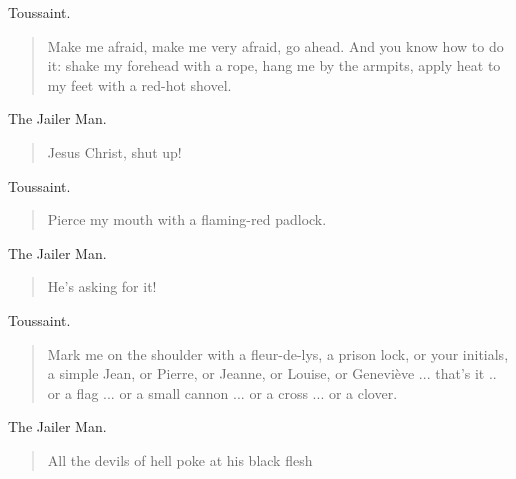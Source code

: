 \documentclass[letterpaper,article,12pt,oneside,notitlepage]{memoir}
\begin{document}
\clearpage

\begin{center}Toussaint.\end{center}

\begin{verse}
Make me afraid, make me very afraid, go ahead. And you know how to do it: shake my forehead with a rope, hang me by the armpits, apply heat to my feet with a red-hot shovel. \\
\end{verse}

\begin{center}The Jailer Man.\end{center}

\begin{verse}
Jesus Christ, shut up! \\
\end{verse}

\begin{center}Toussaint.\end{center}

\begin{verse}
Pierce my mouth with a flaming-red padlock. \\
\end{verse}

\begin{center}The Jailer Man.\end{center}

\begin{verse}
He's asking for it! \\
\end{verse}

\begin{center}Toussaint.\end{center}

\begin{verse}
Mark me on the shoulder with a fleur-de-lys, a prison lock, or your initials, a simple Jean, or Pierre, or Jeanne, or Louise, or Geneviève ... that's it .. or a flag ... or a small cannon ... or a cross ... or a clover.  \\
\end{verse}

\begin{center}The Jailer Man.\end{center}

\begin{verse}
All the devils of hell poke at his black flesh \\
\end{verse}
\end{document}
